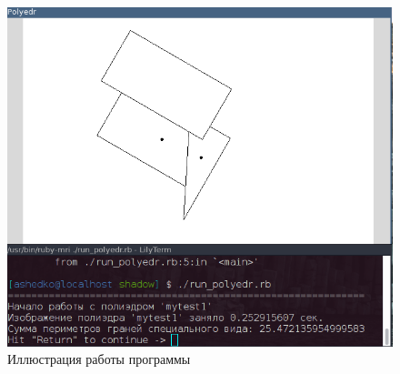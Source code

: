 \begin{figure}[ht!]
\begin{center}
\includegraphics[scale=0.8]{images/poly_1.png}
\caption{Иллюстрация работы программы} \label{fig:poly_fig}
\end{center}
\end{figure}